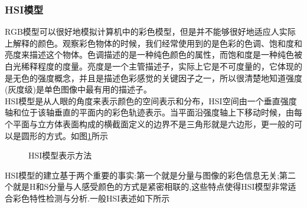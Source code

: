 \documentclass[UTF8,a4paper,10pt]{ctexart}
\begin{document}
\begin{flushleft}
        \subsubsection{HSI模型}
        \hspace{2em}RGB模型可以很好地模拟计算机中的彩色模型，但是并不能够很好地适应人实际上解释的颜色。观察彩色物体的时候，我们经常使用到的是色彩的色调、饱和度和亮度来描述这个物体。色调描述的是一种纯色颜色的属性，而饱和度是一种纯色被白光稀释程度的度量。亮度是一个主管描述子，实际上它是不可度量的，它体现的是无色的强度概念，并且是描述色彩感觉的关键因子之一，所以很清楚地知道强度(灰度级)是单色图像中最有用的描述子。\\
        \hspace{2em}HSI模型是从人眼的角度来表示颜色的空间表示和分布，HSI空间由一个垂直强度轴和位于该轴垂直的平面内的彩色轨迹表示。当平面沿强度轴上下移动时候，由每个平面与立方体表面构成的横截面定义的边界不是三角形就是六边形，更一般的可以是圆形的方式。如图\ref{fig:fig_hsi_model}所示\\
        \begin{figure}[htbp]
            \centering
            \caption{HSI模型表示方法}
            \label{fig:fig_hsi_model}
        \end{figure}
        \hspace{2em}HSI模型的建立基于两个重要的事实:第一个就是分量与图像的彩色信息无关;第二个就是H和S分量与人感受颜色的方式是紧密相联的,这些特点使得HSI模型非常适合彩色特性检测与分析.一般HSI表述如下所示

\end{flushleft}
\end{document}
